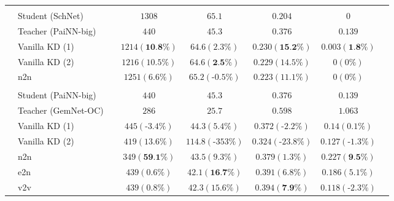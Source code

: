 \documentclass{article}
\begin{document}
\begin{table}
\begin{tabular}{llcccccc}
\multicolumn{7}{c}{} \\
\parbox[t]{2mm}{} & Student (SchNet)                  &   &              $1308$     &   $65.1$    &  $0.204$  &  $0$   \\
& Teacher (PaiNN-big)                       &   &              $440$        &   $45.3$     &   $0.376$      &   $0.139$    \\
& Vanilla KD (1)             &   &            $1214 (\textbf{10.8\%})$          &          $64.6 (2.3\%)$     &     $0.230 (\textbf{15.2\%})$        &  $0.003 (\textbf{1.8\%})$ \\
& Vanilla KD (2)               &   &            $1216 (10.5\%)$          &          $64.6 (\textbf{2.5\%})$     &     $0.229 (14.5\%)$        &  $0 (0\%)$ &  \\
& n2n              &   &            $1251 (6.6\%)$          &          $65.2 (\text{-}0.5\%)$     &     $0.223 (11.1\%)$        &  $0 (0\%)$  &  \\
 \\
\parbox[t]{2mm}{} & Student (PaiNN-big)                  &   &              $440$        &   $45.3$     &   $0.376$      &   $0.139$    \\
& Teacher (GemNet-OC)                      &   &              $286$        &   $25.7$     &   $0.598$      &   $1.063$     \\
& Vanilla KD (1)           &   &            $445 (\text{-}3.4\%)$          &          $44.3 (5.4\%)$     &     $0.372 (\text{-}2.2\%)$        &  $0.14 (0.1\%)$    \\
& Vanilla KD (2)             &   &            $419 (13.6\%)$          &          $114.8 (\text{-}353\%)$     &     $0.324 (\text{-}23.8\%)$        &  $0.127 (\text{-}1.3\%)$   \\
& n2n              &   &            $349 (\textbf{59.1\%})$          &          $43.5 (9.3\%)$     &     $0.379 (1.3\%)$        &  $0.227 (\textbf{9.5\%})$   \\
& e2n               &   &            $439 (0.6\%)$          &          $42.1 (\textbf{16.7\%})$     &     $0.391 (6.8\%)$        &  $0.186 (5.1\%)$     \\
& v2v              &   &            $439 (0.8\%)$          &          $42.3 (15.6\%)$     &     $0.394 (\textbf{7.9\%})$        &  $0.118 (\text{-}2.3\%)$        
\end{tabular}
\label{tab:main_results}
\end{table}
\end{document}
